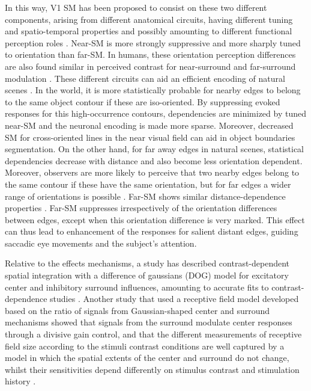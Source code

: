 In this way, V1 SM has been proposed to consist on these two different components, arising from different anatomical circuits, having different tuning and spatio-temporal properties and possibly amounting to different functional perception roles \cite{Nurminen2014}. Near-SM is more strongly suppressive \cite{Shushruth2009} and more sharply tuned to orientation than far-SM. In humans, these orientation perception differences are also found similar in perceived contrast for near-surround and far-surround modulation \cite{Shushruth2013}. These different circuits can aid an efficient encoding of natural scenes \cite{Shushruth2013}. In the world, it is more statistically probable for nearby edges to belong to the same object contour if these are iso-oriented. By suppressing evoked responses for this high-occurrence contours, dependencies are minimized by tuned near-SM and the neuronal encoding is made more sparse. Moreover, decreased SM for cross-oriented lines in the near visual field can aid in object boundaries segmentation. On the other hand, for far away edges in natural scenes, statistical dependencies decrease with distance and also become less orientation dependent. Moreover, observers are more likely to perceive that two nearby edges belong to the same contour if these have the same orientation, but for far edges a wider range of orientations is possible \cite{Wertheimer1958}. Far-SM shows similar distance-dependence properties \cite{Nurminen2014}. Far-SM suppresses irrespectively of the orientation differences between edges, except when this orientation difference is very marked. This effect can thus lead to enhancement of the responses for salient distant edges, guiding saccadic eye movements and the subject's attention.

Relative to the effects mechanisms, a study has described contrast-dependent spatial integration with a difference of gaussians (DOG) model for excitatory center and inhibitory surround influences, amounting to accurate fits to contrast-dependence studies \cite{Sceniak1999}. Another study that used a receptive field model developed based on the ratio of signals from Gaussian-shaped center and surround mechanisms showed that signals from the surround modulate center responses through a divisive gain control, and that the different measurements of receptive field size according to the stimuli contrast conditions are well captured by a model in which the spatial extents of the center and surround do not change, whilst their sensitivities depend differently on stimulus contrast and stimulation history \cite{Cavanaugh2002a}. 

